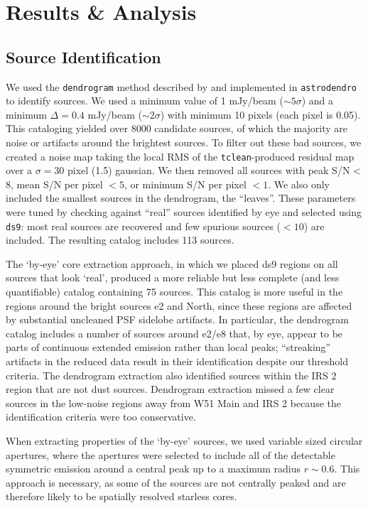 \documentclass{emulateapj}
\begin{document}
\section{Results \& Analysis}
\label{sec:results}
\subsection{Source Identification}
\label{sec:sourceid}
We used the \texttt{dendrogram} method described by \citet{Rosolowsky2008c} and
implemented in \texttt{astrodendro} to identify sources.  We used a minimum
value of 1 mJy/beam ($\sim5\sigma$) and a minimum $\Delta=0.4$ mJy/beam
($\sim2\sigma$) with minimum 10 pixels (each pixel is 0.05\arcsec).  This
cataloging yielded over 8000 candidate sources, of which the majority are noise
or artifacts around the brightest sources.  To filter out these bad sources,
we created a noise map taking the local RMS of the \texttt{tclean}-produced
residual map over a $\sigma=30$ pixel (1.5\arcsec) gaussian.  We then removed
all sources with peak S/N < 8, mean S/N per pixel $< 5$, or minimum S/N per
pixel $ < 1$.  We also only included the smallest sources in the dendrogram,
the ``leaves''.  These parameters were tuned by checking against ``real''
sources identified by eye and selected using \texttt{ds9}: most real sources are
recovered and few spurious sources ($<10$) are
included.  The resulting catalog includes 113 sources.

The `by-eye' core extraction approach, in which we placed ds9 regions on all
sources that look `real', produced a more reliable but less complete (and less
quantifiable) catalog containing 75 sources.  This catalog is more useful in
the regions around the bright sources e2 and North, since these regions are
affected by substantial uncleaned PSF sidelobe artifacts.  In particular, the
dendrogram catalog includes a number of sources around e2/e8 that, by eye,
appear to be parts of continuous extended emission rather than local peaks;
``streaking'' artifacts in the reduced data result in their identification
despite our threshold criteria.  The dendrogram extraction also identified
sources within the IRS 2 \hii region that are not dust sources.  Dendrogram
extraction missed a few clear sources in the low-noise regions away from
W51 Main and IRS 2 because the identification criteria were too conservative.

When extracting properties of the `by-eye' sources, we used variable sized
circular apertures, where the apertures were selected to include all of the
detectable symmetric emission around a central peak up to a maximum radius
$r\sim0.6$\arcsec.  This approach is necessary, as some of the sources are not
centrally peaked and are therefore likely to be spatially resolved starless
cores.
\end{document}
